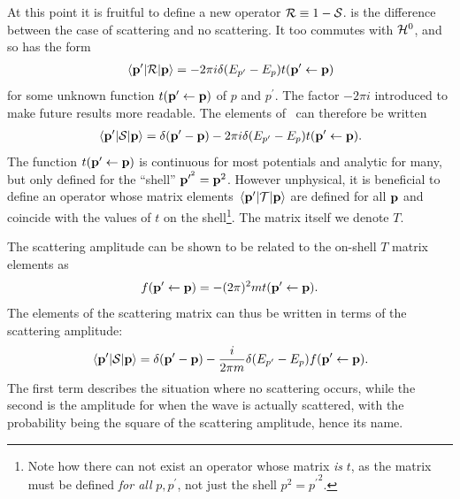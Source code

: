 At this point it is fruitful to define a new operator \(\mathcal{R} \equiv 1 -
\mathcal{S}\).  is the difference between the case of scattering and no scattering. It too commutes with \(\mathcal{H}^{0}\), and so has the form
\begin{align*}
  \mel{\vb{p}^{\prime}}{\mathcal{R}}{\vb{p}} = -2\pi i\delta(E_{p^{\prime}}-E_{p})t(\vb{p}^{\prime}\leftarrow \vb{p})
\end{align*}
for some unknown function \(t(\vb{p}^{\prime}\leftarrow\vb{p})\) of \(p\) and
\(p^{\prime}\). The factor \(-2\pi i\) introduced to make future results more readable. The elements of\ \mscat{} can therefore be written 
\begin{align*}
  \mel{\vb{p}^{\prime}}{\mathcal{S}}{\vb{p}} = \delta(\vb{p}^{\prime} - \vb{p}) - 2\pi i \delta(E_{p^{\prime}}-E_{p})t(\vb{p}^{\prime}\leftarrow \vb{p}).
\end{align*}
 The function
\(t(\vb{p}^{\prime}\leftarrow \vb{p})\) is continuous for most potentials and
analytic for many\cite[p.~42]{taylor}, but only defined for the ``shell'' \(\vb{p}^{{\prime}^{2}} =
\vb{p}^{2}\). However unphysical, it is beneficial to define an
operator  whose matrix elements \(\mel{\vb{p}^{\prime}}{\mathcal{T}}{\vb{p}}\) are defined for all \(\vb{p}\) and
coincide with the values of \(t\) on the shell\footnote{Note how there can not
  exist an operator  whose matrix \textit{is} \(t\), as the
  matrix must be defined \textit{for all} \(p, p^{\prime}\), not just the shell
  \(p^{2}={p^{\prime}}^{2}\).}. The matrix itself we denote \(T\).

The scattering amplitude can be shown to be related to the on-shell \(T\)
matrix elements as\cite[p.~172]{taylor}
\begin{align*}
  f(\vb{p}^{\prime} \leftarrow \vb{p})= -(2\pi)^{2}mt(\vb{p}^{\prime}\leftarrow\vb{p}).
\end{align*}
The elements of the scattering matrix can thus be written in terms of the
scattering amplitude:
\begin{align*}
  \mel{\vb{p}^{\prime}}{\mathcal{S}}{\vb{p}} = \delta(\vb{p}^{\prime} - \vb{p}) - \frac{i}{2\pi m}\delta(E_{p^{\prime}}-E_{p})f(\vb{p}^{\prime}\leftarrow \vb{p}).
\end{align*}
The first term describes the situation where no scattering occurs, while the
second is the amplitude for when the wave is actually scattered, with the
probability being the square of the scattering amplitude, hence its name.

